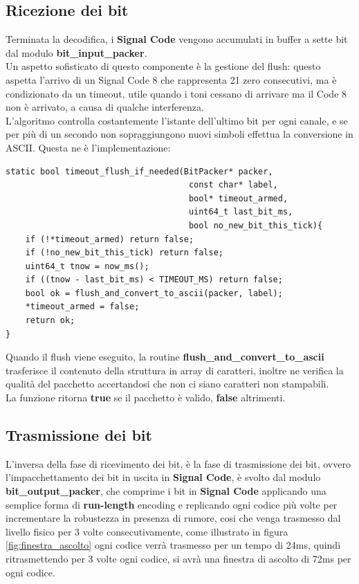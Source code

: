\subsection{Ricezione dei bit}
Terminata la decodifica, i \textbf{Signal Code} vengono accumulati in buffer a sette bit dal modulo \textbf{bit\_input\_packer}. \\ 
Un aspetto sofisticato di questo componente è la gestione del flush: questo aspetta l'arrivo di un Signal Code 8 che rappresenta 21 zero consecutivi,
ma è condizionato da un timeout, utile quando i toni cessano di arrivare ma il Code 8 non è arrivato, a causa di qualche interferenza. \\
 L’algoritmo controlla costantemente l’istante dell’ultimo bit per ogni canale, e se per più di un secondo non sopraggiungono nuovi simboli effettua la conversione in ASCII.
Questa ne è l'implementazione:

\begin{verbatim}
static bool timeout_flush_if_needed(BitPacker* packer,
                                     const char* label,
                                     bool* timeout_armed,
                                     uint64_t last_bit_ms,
                                     bool no_new_bit_this_tick){
    if (!*timeout_armed) return false;
    if (!no_new_bit_this_tick) return false;
    uint64_t tnow = now_ms();
    if ((tnow - last_bit_ms) < TIMEOUT_MS) return false;
    bool ok = flush_and_convert_to_ascii(packer, label);
    *timeout_armed = false;
    return ok;
}
\end{verbatim}

Quando il flush viene eseguito, la routine \textbf{flush\_and\_convert\_to\_ascii} 
trasferisce il contenuto della struttura in array di caratteri, inoltre ne verifica la qualità del pacchetto accertandosi che non ci siano caratteri non stampabili.\\
 La funzione ritorna \textbf{true} se il pacchetto è valido, \textbf{false} altrimenti.

\subsection{Trasmissione dei bit}

 L'inversa della fase di ricevimento dei bit, è la fase di trasmissione dei bit, ovvero l’impacchettamento dei bit in uscita in \textbf{Signal Code}, 
 è svolto dal modulo 
 \textbf{bit\_output\_packer}, che comprime i bit in \textbf{Signal Code} applicando una semplice forma di \textbf{run-length}
  encoding e replicando ogni codice più volte per incrementare la robustezza in presenza di rumore, cosi che venga trasmesso dal livello fisico 
  per 3 volte consecutivamente, come illustrato in figura \autoref{fig:finestra_ascolto} ogni codice verrà trasmesso per un tempo di 24ms, quindi ritrasmettendo 
  per 3 volte ogni codice, si avrà una finestra di ascolto di 72ms per ogni codice.\\

